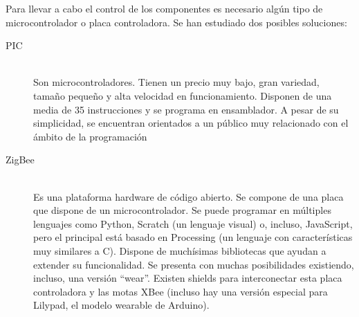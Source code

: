 Para llevar a cabo el control de los componentes es necesario algún tipo de microcontrolador
o placa controladora. Se han estudiado dos posibles soluciones:

\begin{description}
  \item[PIC] \hfill \\
    Son microcontroladores. Tienen un precio muy bajo, gran variedad, tamaño pequeño y alta velocidad en funcionamiento.
    Disponen de una media de 35 instrucciones y se programa en ensamblador. A pesar de su simplicidad,
    se encuentran orientados a un público muy relacionado con el ámbito de la programación
  \item[ZigBee] \hfill \\
    Es una plataforma hardware de código abierto.
    Se compone de una placa que dispone de un microcontrolador.
    Se puede programar en múltiples lenguajes como Python, Scratch (un lenguaje visual) o, incluso, JavaScript,
    pero el principal está basado en Processing (un lenguaje con características muy similares a C). Dispone de muchísimas
    bibliotecas que ayudan a extender su funcionalidad. Se presenta con muchas posibilidades existiendo, incluso, una versión “wear”.
    Existen shields para interconectar esta placa controladora y las motas XBee (incluso hay una versión especial para Lilypad,
    el modelo wearable de Arduino).
\end{description}
